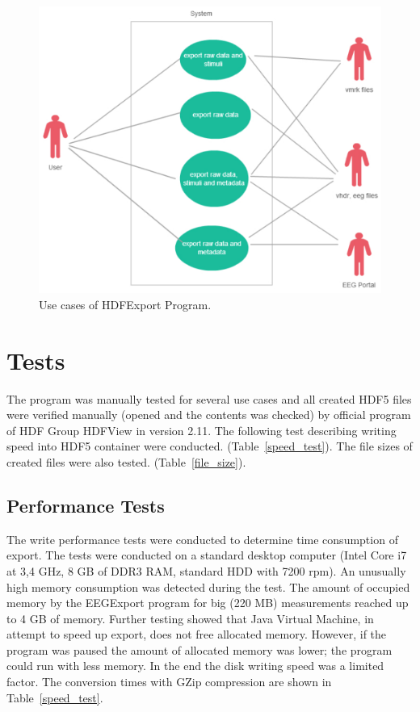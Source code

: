 \documentclass[conference]{IEEEtran}
\begin{document}
\begin{figure}
	\includegraphics[scale=0.5]{obrazky/use_case_data.pdf}	
	\caption{Use cases of HDFExport Program.}
	\label{use_case2}
\end{figure}


\section{Tests}

The program was manually tested for several use cases and all created HDF5 files were verified manually (opened and the contents was checked) by official program of HDF Group HDFView \cite{hdfjava} in version 2.11. The following test describing writing speed into HDF5 container were conducted. (Table~\ref{speed_test}). The file sizes of created files were also tested. (Table~\ref{file_size}).

\subsection{Performance Tests}

The write performance tests were conducted to determine time consumption of export. The tests were conducted on a standard desktop computer (Intel Core i7 at 3,4 GHz, 8 GB of DDR3 RAM, standard HDD with 7200 rpm). An unusually high memory consumption was detected during the test. The amount of occupied memory by the EEGExport program for big (220 MB) measurements reached up to 4 GB of memory. Further testing showed that Java Virtual Machine, in attempt to speed up export, does not free allocated memory. However, if the program was paused the amount of allocated memory was lower; the program could run with less memory. In the end the disk writing speed was a limited factor. The conversion times with GZip compression are shown in Table~\ref{speed_test}.
\end{document}
